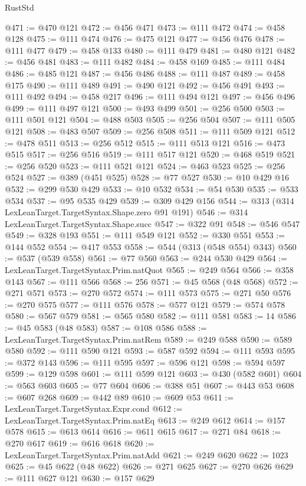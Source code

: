 \begin{lexlean}{RustStd}
\begin{coremodule}
@471 := @470 @121
@472 := @456 @471
@473 := @111 @472
@474 := @458 @128
@475 := @111 @474
@476 := @475 @121
@477 := @456 @476
@478 := @111 @477
@479 := @458 @133
@480 := @111 @479
@481 := @480 @121
@482 := @456 @481
@483 := @111 @482
@484 := @458 @169
@485 := @111 @484
@486 := @485 @121
@487 := @456 @486
@488 := @111 @487
@489 := @458 @175
@490 := @111 @489
@491 := @490 @121
@492 := @456 @491
@493 := @111 @492
@494 := @458 @217
@496 := @111 @494 @121
@497 := @456 @496
@499 := @111 @497 @121
@500 := @493 @499
@501 := @256 @500
@503 := @111 @501 @121
@504 := @488 @503
@505 := @256 @504
@507 := @111 @505 @121
@508 := @483 @507
@509 := @256 @508
@511 := @111 @509 @121
@512 := @478 @511
@513 := @256 @512
@515 := @111 @513 @121
@516 := @473 @515
@517 := @256 @516
@519 := @111 @517 @121
@520 := @468 @519
@521 := @256 @520
@523 := @111 @521 @121
@524 := @463 @523
@525 := @256 @524
@527 := @389 (@451 @525)
@528 := @77 @527
@530 := @10 @429 @16
@532 := @299 @530 @429
@533 := @10 @532
@534 := @54 @530
@535 := @533 @534
@537 := @95 @535 @429
@539 := @309 @429 @156
@544 := @313 (@314 LexLeanTarget.TargetSyntax.Shape.zero @91 @191)
@546 := @314 LexLeanTarget.TargetSyntax.Shape.succ
@547 := @322 @91
@548 := @546 @547
@549 := @328 @193
@551 := @111 @549 @121
@552 := @330 @551
@553 := @144 @552
@554 := @417 @553
@558 := @544 (@313 (@548 @554) @343)
@560 := @537 (@539 @558)
@561 := @77 @560
@563 := @244 @530 @429
@564 := LexLeanTarget.TargetSyntax.Prim.natQuot
@565 := @249 @564
@566 := @358 @143
@567 := @111 @566
@568 := 256
@571 := @45 @568 (@48 @568)
@572 := @271 @571
@573 := @270 @572
@574 := @111 @573
@575 := @271 @50
@576 := @270 @575
@577 := @111 @576
@578 := @577 @121
@579 := @574 @578
@580 := @567 @579
@581 := @565 @580
@582 := @111 @581
@583 := 14
@586 := @45 @583 (@48 @583)
@587 := @108 @586
@588 := LexLeanTarget.TargetSyntax.Prim.natRem
@589 := @249 @588
@590 := @589 @580
@592 := @111 @590 @121
@593 := @587 @592
@594 := @111 @593
@595 := @372 @143
@596 := @111 @595
@597 := @596 @121
@598 := @594 @597
@599 := @129 @598
@601 := @111 @599 @121
@603 := @430 (@582 @601)
@604 := @563 @603
@605 := @77 @604
@606 := @388 @51
@607 := @443 @53
@608 := @607 @268
@609 := @442 @89
@610 := @609 @53
@611 := LexLeanTarget.TargetSyntax.Expr.cond
@612 := LexLeanTarget.TargetSyntax.Prim.natEq
@613 := @249 @612
@614 := @157 @578
@615 := @613 @614
@616 := @611 @615
@617 := @271 @84
@618 := @270 @617
@619 := @616 @618
@620 := LexLeanTarget.TargetSyntax.Prim.natAdd
@621 := @249 @620
@622 := 1023
@625 := @45 @622 (@48 @622)
@626 := @271 @625
@627 := @270 @626
@629 := @111 @627 @121
@630 := @157 @629

\end{coremodule}
\end{lexlean}
